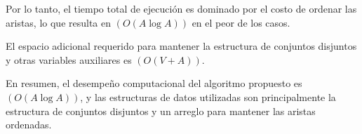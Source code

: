 \documentclass[answers, 11pt]{exam}
\begin{document}
\begin{questions}
\begin{solution}
\begin{itemize}
        Por lo tanto, el tiempo total de ejecución es dominado por el costo de ordenar las aristas, lo que resulta en $(O(A \log A))$ en el peor de los casos.

        El espacio adicional requerido para mantener la estructura de conjuntos disjuntos y otras variables auxiliares es $(O(V + A))$.

        En resumen, el desempeño computacional del algoritmo propuesto es $(O(A \log A))$, y las estructuras de datos utilizadas son principalmente la estructura de conjuntos disjuntos y un arreglo para mantener las aristas ordenadas.
    \end{itemize}
  \end{solution}
  
\end{questions}
\end{document}

